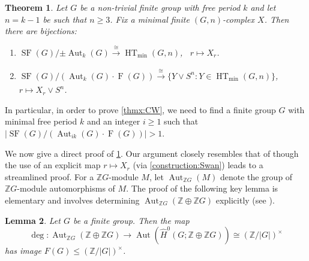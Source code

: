 \documentclass[11pt,leqno,a4paper]{amsart}
\newcommand{\Z}{\mathbb{Z}}
\DeclareMathOperator{\Aut}{Aut}
\DeclareMathOperator{\SF}{SF}
\DeclareMathOperator{\HT}{HT}
\DeclareMathOperator{\FF}{F}
\newtheorem{thm}{Theorem}[section]
\newtheorem{lemma}[thm]{Lemma}
\theoremstyle{definition}
\theoremstyle{remark}
\theoremstyle{custom}
\newenvironment{clist}[1]
{\begin{enumerate}[\normalfont #1]}
{\end{enumerate}}
\newcommand{\wh}{\widehat}
\begin{document}
\begin{thm} \label{thm:main-homotopy-classification}
Let $G$ be a non-trivial finite group with free period $k$ and let $n=k-1$ be such that $n \ge 3$. Fix a minimal finite $(G,n)$-complex $X$. Then there are bijections:
\begin{clist}{(i)}
\item 
  $\SF(G)/{\pm{\Aut_{k}(G)}} \xrightarrow[]{\cong} \HT_{\min}(G,n)$, \, $r \mapsto X_r$.
\item 
$\SF(G)/ (\Aut_{k}(G) \cdot \FF(G)) \xrightarrow[]{\cong} \{Y \vee S^n : Y \in \HT_{\min}(G,n)\}$, \, $r \mapsto X_r \vee S^n$.
\end{clist}	
\end{thm}

In particular, in order to prove \cref{thmx:CW}, we need to find a finite group $G$ with minimal free period $k$ and an integer $i \ge 1$ such that $|\SF(G)/ (\Aut_{ik}(G) \cdot \FF(G))| > 1$.

We now give a direct proof of \cref{thm:main-homotopy-classification}. Our argument closely resembles that of \cite[Theorem 9.1]{Dy76} though the use of an explicit map $r \mapsto X_r$ (via \cref{construction:Swan}) leads to a streamlined proof.
For a $\Z G$-module $M$, let $\Aut_{\Z G}(M)$ denote the group of $\Z G$-module automorphisms of $M$. The proof of the following key lemma is elementary and involves determining $\Aut_{\Z G}(\Z \oplus \Z G)$ explicitly (see \cite[Proposition 4.1 (c)$\Rightarrow$(a)]{Dy76}).

\begin{lemma} \label{lemma:deg-aut}
Let $G$ be a finite group. Then the map
\[ \deg : \Aut_{\Z G}(\Z \oplus \Z G) \to \Aut(\wh H^0(G;\Z \oplus \Z G)) \cong (\Z/|G|)^\times  \]
has image $F(G) \le (\Z/|G|)^\times$.
\end{lemma}
\end{document}
